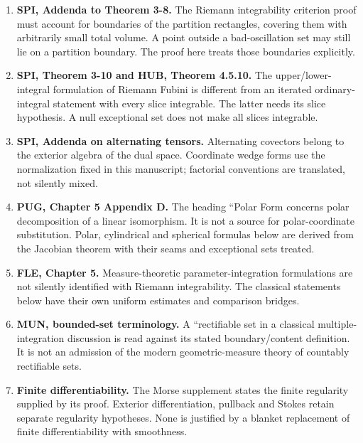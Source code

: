 \documentclass[11pt,oneside,openany]{book}
\theoremstyle{definition}
\theoremstyle{remark}
\begin{document}
\begin{enumerate}[leftmargin=*]

\item \textbf{SPI, Addenda to Theorem 3-8.} The Riemann integrability criterion proof must account for boundaries of the partition rectangles, covering them with arbitrarily small total volume. A point outside a bad-oscillation set may still lie on a partition boundary. The proof here treats those boundaries explicitly.

\item \textbf{SPI, Theorem 3-10 and HUB, Theorem 4.5.10.} The upper/lower-integral formulation of Riemann Fubini is different from an iterated ordinary-integral statement with every slice integrable. The latter needs its slice hypothesis. A null exceptional set does not make all slices integrable.

\item \textbf{SPI, Addenda on alternating tensors.} Alternating covectors belong to the exterior algebra of the dual space. Coordinate wedge forms use the normalization fixed in this manuscript; factorial conventions are translated, not silently mixed.

\item \textbf{PUG, Chapter 5 Appendix D.} The heading ``Polar Form concerns polar decomposition of a linear isomorphism. It is not a source for polar-coordinate substitution. Polar, cylindrical and spherical formulas below are derived from the Jacobian theorem with their seams and exceptional sets treated.

\item \textbf{FLE, Chapter 5.} Measure-theoretic parameter-integration formulations are not silently identified with Riemann integrability. The classical statements below have their own uniform estimates and comparison bridges.

\item \textbf{MUN, bounded-set terminology.} A ``rectifiable set in a classical multiple-integration discussion is read against its stated boundary/content definition. It is not an admission of the modern geometric-measure theory of countably rectifiable sets.

\item \textbf{Finite differentiability.} The Morse supplement states the finite regularity supplied by its proof. Exterior differentiation, pullback and Stokes retain separate regularity hypotheses. None is justified by a blanket replacement of finite differentiability with smoothness.

\end{enumerate}
\end{document}
